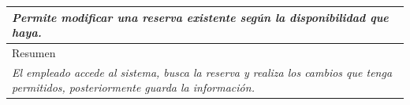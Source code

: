 \begin{table}[H]
\begin{tabular}{|llllllll|}
    \multicolumn{8}{|p{15cm}|}{{\color[HTML]{808080} \textit{Permite modificar una reserva existente seg\'un la disponibilidad que haya.}}}                                                                                                                                                                                       \\ \hline
    \multicolumn{8}{|l|}{Resumen}                                                                                                                                                                                                                                           \\ \hline
    \multicolumn{8}{|p{15cm}|}{{\color[HTML]{808080} \textit{El empleado accede al sistema, busca la reserva y realiza los cambios que tenga permitidos, posteriormente guarda la informaci\'on.}}} \\ \hline
    \end{tabular}
\end{table}

